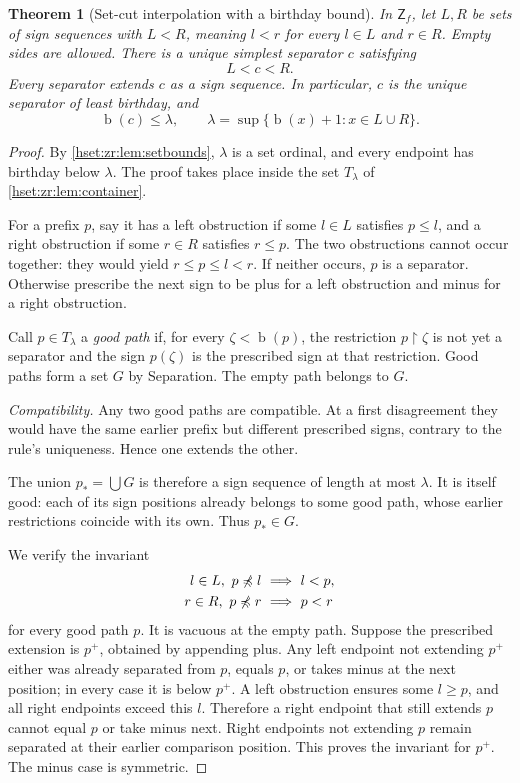 \documentclass[11pt,letterpaper]{article}
\newtheorem{theorem}{Theorem}[section]
\theoremstyle{definition}
\theoremstyle{remark}
\newcommand{\bd}{\operatorname{b}}
\newcommand{\Zf}{\mathsf{Z}_{\!f}}
\newcommand{\pref}{\preccurlyeq}
\newcommand{\restr}{\mathbin{\upharpoonright}}
\begin{document}
\begin{theorem}[Set-cut interpolation with a birthday bound]
\label{hset:zr:thm:setcut}
In $\Zf$, let $L,R$ be sets of sign sequences with $L<R$, meaning $l<r$ for every $l\in L$ and $r\in R$. Empty sides are allowed. There is a unique simplest separator $c$ satisfying
\[
L<c<R.
\]
Every separator extends $c$ as a sign sequence. In particular, $c$ is the unique separator of least birthday, and
\[
\bd(c)\leq\lambda,
\qquad
\lambda=\sup\{\bd(x)+1:x\in L\cup R\}.
\]
\end{theorem}
\begin{proof}
By \cref{hset:zr:lem:setbounds}, $\lambda$ is a set ordinal, and every endpoint has birthday below $\lambda$. The proof takes place inside the set $T_\lambda$ of \cref{hset:zr:lem:container}.

For a prefix $p$, say it has a left obstruction if some $l\in L$ satisfies $p\leq l$, and a right obstruction if some $r\in R$ satisfies $r\leq p$. The two obstructions cannot occur together: they would yield $r\leq p\leq l<r$. If neither occurs, $p$ is a separator. Otherwise prescribe the next sign to be plus for a left obstruction and minus for a right obstruction.

Call $p\in T_\lambda$ a \emph{good path} if, for every $\zeta<\bd(p)$, the restriction $p\restr\zeta$ is not yet a separator and the sign $p(\zeta)$ is the prescribed sign at that restriction. Good paths form a set $G$ by Separation. The empty path belongs to $G$.

\emph{Compatibility.} Any two good paths are compatible. At a first disagreement they would have the same earlier prefix but different prescribed signs, contrary to the rule's uniqueness. Hence one extends the other.

The union $p_* = \bigcup G$ is therefore a sign sequence of length at most $\lambda$. It is itself good: each of its sign positions already belongs to some good path, whose earlier restrictions coincide with its own. Thus $p_*\in G$.

We verify the invariant
\begin{align}
\label{hset:zr:eq:invariant}
l\in L,\ p\not\pref l&\ \Longrightarrow\ l<p,\\
\notag
r\in R,\ p\not\pref r&\ \Longrightarrow\ p<r
\end{align}
for every good path $p$. It is vacuous at the empty path. Suppose the prescribed extension is $p^+$, obtained by appending plus. Any left endpoint not extending $p^+$ either was already separated from $p$, equals $p$, or takes minus at the next position; in every case it is below $p^+$. A left obstruction ensures some $l\geq p$, and all right endpoints exceed this $l$. Therefore a right endpoint that still extends $p$ cannot equal $p$ or take minus next. Right endpoints not extending $p$ remain separated at their earlier comparison position. This proves the invariant for $p^+$. The minus case is symmetric.


\end{proof}
\end{document}
